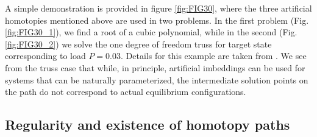 \begin{figure*}[h]
	\centering
	\qquad
	\caption{Homotopy paths for \textbf{(a)} $f(x)=x^3-6x^2+21x-26=0$, with 
		starting point
		$x_0=0$ and convergence at root $x_1=2$ when $t=1$ and 
		\textbf{(b)}
		truss, with initial state the undeformed
		configuration($x_0=0$) and target load level $P=0.03$.}%
	\label{fig:FIG30}%
\end{figure*}
\clearpage
A simple demonstration is provided in figure \ref{fig:FIG30}, where the
three artificial homotopies
mentioned above are used in two problems. In the first problem
(Fig. \ref{fig:FIG30_1}), we find a root 
of a cubic polynomial, while in the second (Fig. \ref{fig:FIG30_2}) 
we solve the 
one degree of freedom truss for target state corresponding to load $P=0.03$. 
Details for this example are taken from \cite{Rheinboldt:1981}. We see
from the truss case that while, in principle, artificial imbeddings can be 
used for systems that can be naturally parameterized, the intermediate solution
points on the path do not correspond to actual equilibrium configurations. 

\subsection{Regularity and existence of homotopy paths}\label{CH4-S1SS2}

